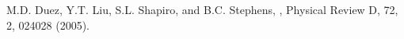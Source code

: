 \begin{thebibliography}{1}

  M.D. Duez, Y.T. Liu, S.L. Shapiro, and B.C. Stephens,
  ,
  Physical Review D, 72, 2, 024028 (2005).

\end{thebibliography}



